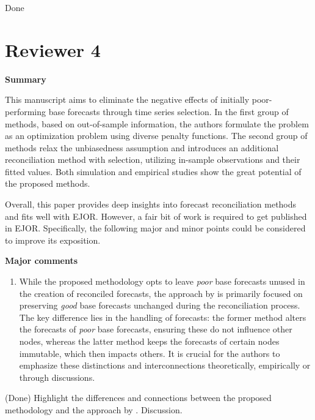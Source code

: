 \documentclass[11pt,a4paper,]{article}
\providecommand{\tightlist}{%
  \setlength{\itemsep}{0pt}\setlength{\parskip}{0pt}}
\renewenvironment{quote}
               {\list{}{\rightmargin\leftmargin}%
                \item\relax\color[RGB]{0,150,0}}
               {\endlist}
\begin{document}
\begin{quote}
Done
\end{quote}

\section{Reviewer 4}\label{reviewer-4}

\textbf{Summary}

This manuscript aims to eliminate the negative effects of initially
poor-performing base forecasts through time series selection. In the
first group of methods, based on out-of-sample information, the authors
formulate the problem as an optimization problem using diverse penalty
functions. The second group of methods relax the unbiasedness assumption
and introduces an additional reconciliation method with selection,
utilizing in-sample observations and their fitted values. Both
simulation and empirical studies show the great potential of the
proposed methods.

Overall, this paper provides deep insights into forecast reconciliation
methods and fits well with EJOR. However, a fair bit of work is required
to get published in EJOR. Specifically, the following major and minor
points could be considered to improve its exposition.

\textbf{Major comments}

\begin{enumerate}
\def\labelenumi{\arabic{enumi}.}
\tightlist
\item
  While the proposed methodology opts to leave \emph{poor} base
  forecasts unused in the creation of reconciled forecasts, the approach
  by \textcite{Zhang2023-op} is primarily focused on preserving
  \emph{good} base forecasts unchanged during the reconciliation
  process. The key difference lies in the handling of forecasts: the
  former method alters the forecasts of \emph{poor} base forecasts,
  ensuring these do not influence other nodes, whereas the latter method
  keeps the forecasts of certain nodes immutable, which then impacts
  others. It is crucial for the authors to emphasize these distinctions
  and interconnections theoretically, empirically or through
  discussions.
\end{enumerate}

\begin{quote}
(Done) Highlight the differences and connections between the proposed
methodology and the approach by \textcite{Zhang2023-op}. Discussion.
\end{quote}
\end{document}
